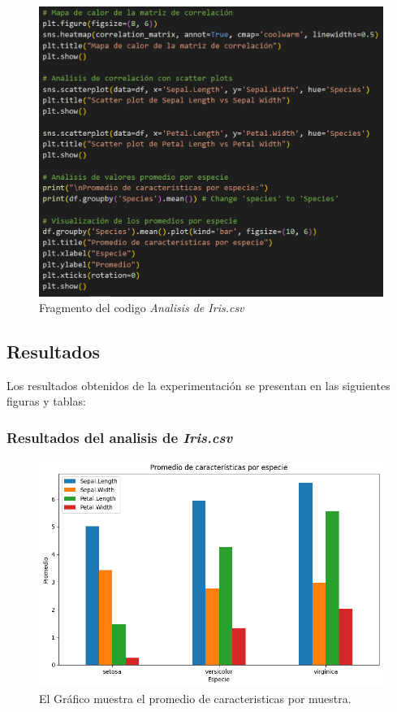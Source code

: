 \documentclass[conference]{IEEEtran}
\begin{document}
        \begin{figure}[h]
            \centering
            \includegraphics[scale=.3]{code3.png}
            \caption{Fragmento del codigo \textit{Analisis de Iris.csv}} 
        \end{figure}
    
    \subsection{Resultados}
        Los resultados obtenidos de la experimentación se presentan en las siguientes figuras y tablas:
        
        \subsubsection{Resultados del analisis de \textit{Iris.csv}}
            \hfill
            \begin{figure}[h]
                \centering
                \includegraphics[width=0.88\linewidth]{IrisGraf1.png}
                \caption{El Gráfico muestra el promedio de caracteristicas por muestra.}
            \end{figure}
    
\end{document}
